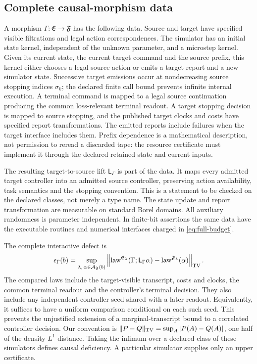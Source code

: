 \subsection{Complete causal-morphism data}
A morphism $\Gamma:\mathfrak E\to\mathfrak F$ has the following data. Source and target have specified visible filtrations and legal action correspondences. The simulator has an initial state kernel, independent of the unknown parameter, and a microstep kernel. Given its current state, the current target command and the source prefix, this kernel either chooses a legal source action or emits a target report and a new simulator state. Successive target emissions occur at nondecreasing source stopping indices $\sigma_k$; the declared finite call bound prevents infinite internal execution. A terminal command is mapped to a legal source continuation producing the common loss-relevant terminal readout. A target stopping decision is mapped to source stopping, and the published target clocks and costs have specified report transformations. The emitted reports include failures when the target interface includes them. Prefix dependence is a mathematical description, not permission to reread a discarded tape: the resource certificate must implement it through the declared retained state and current inputs.

The resulting target-to-source lift $\mathsf L_\Gamma$ is part of the data. It maps every admitted target controller into an admitted source controller, preserving action availability, task semantics and the stopping convention. This is a statement to be checked on the declared classes, not merely a type name. The state update and report transformation are measurable on standard Borel domains. All auxiliary randomness is parameter independent. In finite-bit assertions the same data have the executable routines and numerical interfaces charged in \eqref{eq:full-budget}.

The complete interactive defect is
\begin{equation}\label{eq:defect}
 \epsilon_\Gamma(b)=\sup_{\lambda,\,\alpha\in\mathcal A_{\mathfrak F}(b)}
 \left\|\operatorname{law}^{\mathfrak E_\lambda}(\Gamma;\mathsf L_\Gamma\alpha)
             -\operatorname{law}^{\mathfrak F_\lambda}(\alpha)\right\|_{\mathrm{TV}}.
\end{equation}
The compared laws include the target-visible transcript, costs and clocks, the common terminal readout and the controller's terminal decision. They also include any independent controller seed shared with a later readout. Equivalently, it suffices to have a uniform comparison conditional on each such seed. This prevents the unjustified extension of a marginal-transcript bound to a correlated controller decision. Our convention is $\|P-Q\|_{\mathrm{TV}}=\sup_A|P(A)-Q(A)|$, one half of the density $L^1$ distance. Taking the infimum over a declared class of these simulators defines causal deficiency. A particular simulator supplies only an upper certificate.


